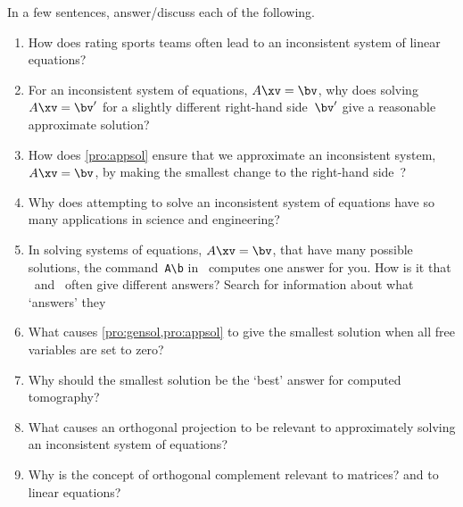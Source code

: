 \begin{exercise}  
In a few sentences, answer\slash discuss each of the following.
\begin{enumerate}
\item How does rating sports teams often lead to an inconsistent system of linear equations?

\item For an inconsistent system of equations, \(A\xv=\bv\), why does solving \(A\xv=\bv'\) for a slightly different right-hand side~\(\bv'\) give a reasonable approximate solution?

\item How does \cref{pro:appsol} ensure that we approximate an inconsistent system, \(A\xv=\bv\), by making the smallest change to the right-hand side~\bv?

\item Why does attempting to solve an inconsistent system of equations have so many applications in science and engineering?

\item In solving systems of equations, \(A\xv=\bv\), that have many possible solutions, the command~\verb|A\b| in \script\ computes one answer for you.  How is it that \script[1]\ and \script[2]\ often give different answers?  Search for information about what `answers' they 

\item What causes \cref{pro:gensol,pro:appsol} to give the smallest solution when all free variables are set to zero?

\item Why should the smallest solution be the `best' answer for computed tomography?

\item What causes an orthogonal projection to be relevant to approximately solving an inconsistent system of equations?


\item Why is the concept of orthogonal complement relevant to matrices?  and to linear equations?

\end{enumerate}
\end{exercise}

